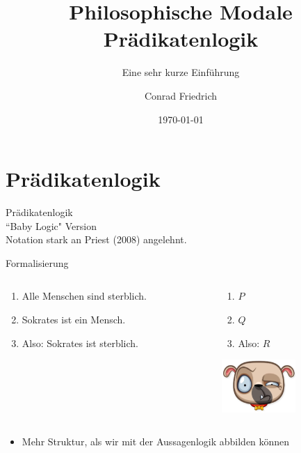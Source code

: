 \documentclass[12pt]{beamer}
\title[Modale Prädikatenlogik]{Philosophische Modale Prädikatenlogik}
\subtitle{Eine sehr kurze Einführung}
\author{Conrad Friedrich}
\institute[Uni Köln]{Universität zu Köln}
\date{\today}
\begin{document}
\begin{frame}
\titlepage
\end{frame}

\section{Prädikatenlogik}

\begin{frame}
  \Huge Prädikatenlogik \\
  \pause \large ``Baby Logic" Version\\
  \pause \large Notation stark an Priest (2008) angelehnt.
\end{frame}

\begin{frame}{Formalisierung}
  \begin{columns}

    \begin{column}[t]{5cm}
      \begin{enumerate}[<+->]
      \item Alle Menschen sind sterblich. \\
      \item Sokrates ist ein Mensch.\\
      \item Also: Sokrates ist sterblich.
      \end{enumerate}
    \end{column}

    \begin{column}[t]{5cm}
      \begin{enumerate}[<+->]
      \item $P$
      \item $Q$
      \item Also: $R$

      \end{enumerate}

      \pause

      \begin{center}
        \includegraphics[height=2cm]{scepticdog.png}
      \end{center}
    \end{column}

  \end{columns}

  \pause

  \vspace{10 mm}
  \begin{itemize}
  \item<4-> Mehr Struktur, als wir mit der Aussagenlogik abbilden
    können
  \end{itemize}
\end{frame}
\end{document}
